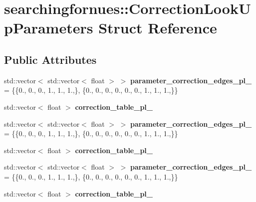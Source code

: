 \hypertarget{structsearchingfornues_1_1CorrectionLookUpParameters}{}\section{searchingfornues\+:\+:Correction\+Look\+Up\+Parameters Struct Reference}
\label{structsearchingfornues_1_1CorrectionLookUpParameters}
\subsection*{Public Attributes}
\begin{DoxyCompactItemize}
\item 
std\+::vector$<$ std\+::vector$<$ float $>$ $>$ {\bfseries parameter\+\_\+correction\+\_\+edges\+\_\+pl\+\_} = \{\{0., 0., 0., 1., 1., 1.,\}, \{0., 0., 0., 0., 0., 0., 1., 1., 1.,\}\}\hypertarget{structsearchingfornues_1_1CorrectionLookUpParameters_a3c10163ada393f141641bb88ad843979}{}\label{structsearchingfornues_1_1CorrectionLookUpParameters_a3c10163ada393f141641bb88ad843979}

\item 
std\+::vector$<$ float $>$ {\bfseries correction\+\_\+table\+\_\+pl\+\_}
\item 
std\+::vector$<$ std\+::vector$<$ float $>$ $>$ {\bfseries parameter\+\_\+correction\+\_\+edges\+\_\+pl\+\_} = \{\{0., 0., 0., 1., 1., 1.,\}, \{0., 0., 0., 0., 0., 0., 1., 1., 1.,\}\}\hypertarget{structsearchingfornues_1_1CorrectionLookUpParameters_a42120e2dc25c42e794d1045c94fe0736}{}\label{structsearchingfornues_1_1CorrectionLookUpParameters_a42120e2dc25c42e794d1045c94fe0736}

\item 
std\+::vector$<$ float $>$ {\bfseries correction\+\_\+table\+\_\+pl\+\_}
\item 
std\+::vector$<$ std\+::vector$<$ float $>$ $>$ {\bfseries parameter\+\_\+correction\+\_\+edges\+\_\+pl\+\_} = \{\{0., 0., 0., 1., 1., 1.,\}, \{0., 0., 0., 0., 0., 0., 1., 1., 1.,\}\}\hypertarget{structsearchingfornues_1_1CorrectionLookUpParameters_ad0ce9fbdd38aad587b09a32a1129f251}{}\label{structsearchingfornues_1_1CorrectionLookUpParameters_ad0ce9fbdd38aad587b09a32a1129f251}

\item 
std\+::vector$<$ float $>$ {\bfseries correction\+\_\+table\+\_\+pl\+\_}
\end{DoxyCompactItemize}


